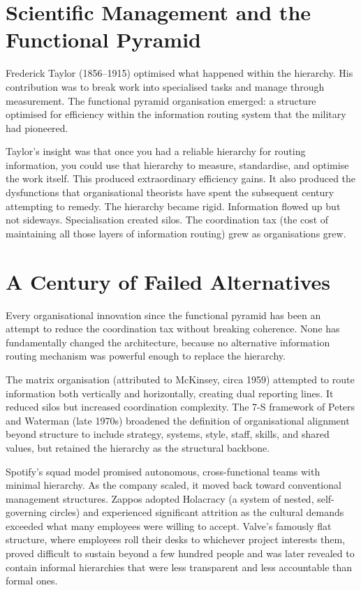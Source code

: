 \section{Scientific Management and the Functional Pyramid}

Frederick Taylor (1856--1915) optimised what happened within the hierarchy. His contribution was to break work into specialised tasks and manage through measurement. The functional pyramid organisation emerged: a structure optimised for efficiency within the information routing system that the military had pioneered.

Taylor's insight was that once you had a reliable hierarchy for routing information, you could use that hierarchy to measure, standardise, and optimise the work itself. This produced extraordinary efficiency gains. It also produced the dysfunctions that organisational theorists have spent the subsequent century attempting to remedy. The hierarchy became rigid. Information flowed up but not sideways. Specialisation created silos. The coordination tax (the cost of maintaining all those layers of information routing) grew as organisations grew.

\section{A Century of Failed Alternatives}

\begin{evidencebox}
Every organisational innovation since the functional pyramid has been an attempt to reduce the coordination tax without breaking coherence. None has fundamentally changed the architecture, because no alternative information routing mechanism was powerful enough to replace the hierarchy.
\end{evidencebox}

The matrix organisation (attributed to McKinsey, circa 1959) attempted to route information both vertically and horizontally, creating dual reporting lines. It reduced silos but increased coordination complexity. The 7-S framework of Peters and Waterman (late 1970s) broadened the definition of organisational alignment beyond structure to include strategy, systems, style, staff, skills, and shared values, but retained the hierarchy as the structural backbone.

Spotify's squad model promised autonomous, cross-functional teams with minimal hierarchy. As the company scaled, it moved back toward conventional management structures. Zappos adopted Holacracy (a system of nested, self-governing circles) and experienced significant attrition as the cultural demands exceeded what many employees were willing to accept. Valve's famously flat structure, where employees roll their desks to whichever project interests them, proved difficult to sustain beyond a few hundred people and was later revealed to contain informal hierarchies that were less transparent and less accountable than formal ones.

